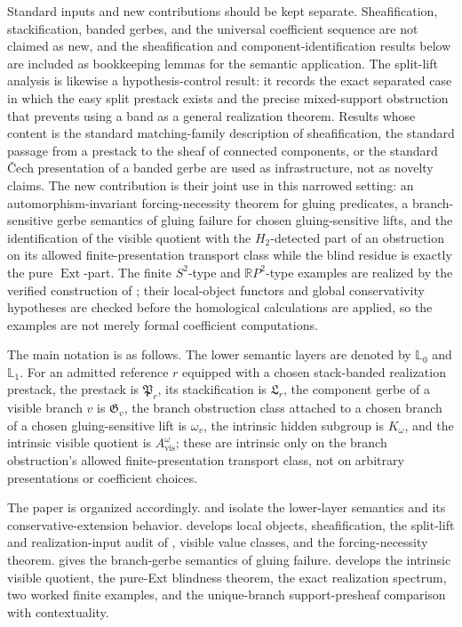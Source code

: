 Standard inputs and new contributions should be kept separate. Sheafification, stackification, banded gerbes, and the universal coefficient sequence are not claimed as new, and the sheafification and component-identification results below are included as bookkeeping lemmas for the semantic application. The split-lift analysis is likewise a hypothesis-control result: it records the exact separated case in which the easy split prestack exists and the precise mixed-support obstruction that prevents using a band as a general realization theorem. Results whose content is the standard matching-family description of sheafification, the standard passage from a prestack to the sheaf of connected components, or the standard \v{C}ech presentation of a banded gerbe are used as infrastructure, not as novelty claims. The new contribution is their joint use in this narrowed setting: an automorphism-invariant forcing-necessity theorem for gluing predicates, a branch-sensitive gerbe semantics of gluing failure for chosen gluing-sensitive lifts, and the identification of the visible quotient with the $H_2$-detected part of an obstruction on its allowed finite-presentation transport class while the blind residue is exactly the pure $\operatorname{Ext}$-part. The finite $S^2$-type and $\mathbb{R}P^2$-type examples are realized by the verified construction of ; their local-object functors and global conservativity hypotheses are checked before the homological calculations are applied, so the examples are not merely formal coefficient computations.

The main notation is as follows. The lower semantic layers are denoted by $\mathbb L_0$ and $\mathbb L_1$. For an admitted reference $r$ equipped with a chosen stack-banded realization prestack, the prestack is $\mathfrak P_r$, its stackification is $\mathfrak L_r$, the component gerbe of a visible branch $v$ is $\mathfrak G_v$, the branch obstruction class attached to a chosen branch of a chosen gluing-sensitive lift is $\omega_v$, the intrinsic hidden subgroup is $K_{\omega}$, and the intrinsic visible quotient is $A_{\mathrm{vis}}^{\omega}$; these are intrinsic only on the branch obstruction's allowed finite-presentation transport class, not on arbitrary presentations or coefficient choices.

The paper is organized accordingly.  and  isolate the lower-layer semantics and its conservative-extension behavior.  develops local objects, sheafification, the split-lift and realization-input audit of , visible value classes, and the forcing-necessity theorem.  gives the branch-gerbe semantics of gluing failure.  develops the intrinsic visible quotient, the pure-Ext blindness theorem, the exact realization spectrum, two worked finite examples, and the unique-branch support-presheaf comparison with contextuality.
